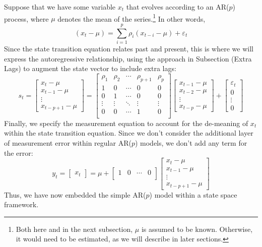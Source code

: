 \documentclass[a4paper,12pt]{article}
\begin{document}
Suppose that we have some variable $x_t$ that evolves according to an AR($p$) process, where $\mu$ denotes the mean of the series.\footnote{Both here and in the next subsection, $\mu$ is assumed to be known. Otherwise, it would need to be estimated, as we will describe in later sections.} In other words,
\[
  (x_t - \mu) = \sum^p_{i=1} \rho_i (x_{t-i} - \mu) 
  + \varepsilon_t
\]
Since the state transition equation relates past and present, this is where we will express the autoregressive relationship, using the approach in Subsection (Extra Lags) to augment the state vector to include extra lags:
\[
  s_t = 
  \begin{bmatrix} x_t - \mu \\ x_{t-1} - \mu \\ \vdots \\
    x_{t-p+1} - \mu \end{bmatrix}
  = 
  \begin{bmatrix}
    \rho_1 & \rho_2 & \cdots & \rho_{p+1} & \rho_p \\
    1 & 0 & \cdots & 0 & 0 \\
    0 & 1 & \cdots & 0 & 0 \\
    \vdots & \vdots & \ddots & \vdots & \vdots \\
    0 & 0 & \cdots & 1 & 0 \\
  \end{bmatrix}
  \begin{bmatrix} x_{t-1} - \mu \\ x_{t-2} - \mu \\ \vdots \\
    x_{t-p}- \mu \end{bmatrix}
  + \begin{bmatrix} \varepsilon_t \\ 0 \\ \vdots \\ 0 
  \end{bmatrix}
\]
Finally, we specify the measurement equation to account for the de-meaning of $x_t$ within the state transition equation. Since we don't consider the additional layer of measurement error within regular AR($p$) models, we don't add any term for the error:
\[
  y_t = \begin{bmatrix} x_t \end{bmatrix}
  = \mu + 
  \begin{bmatrix}
  1 & 0 & \cdots & 0 \\
  \end{bmatrix}
  \begin{bmatrix} x_t - \mu \\ x_{t-1} - \mu \\ \vdots \\
    x_{t-p+1} - \mu \end{bmatrix}
\]
Thus, we have now embedded the simple AR($p$) model within a state space framework.
\end{document}
